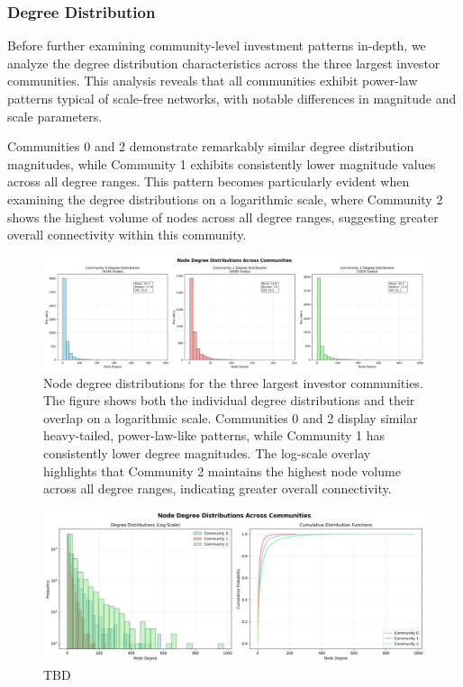 \subsubsection{Degree Distribution}

Before further examining community-level investment patterns in-depth, we analyze the degree distribution characteristics across the three largest investor communities. This analysis reveals that all communities exhibit power-law patterns typical of scale-free networks, with notable differences in magnitude and scale parameters.

Communities 0 and 2 demonstrate remarkably similar degree distribution magnitudes, while Community 1 exhibits consistently lower magnitude values across all degree ranges. This pattern becomes particularly evident when examining the degree distributions on a logarithmic scale, where Community 2 shows the highest volume of nodes across all degree ranges, suggesting greater overall connectivity within this community.


\begin{figure}[ht]
\centering
\includegraphics[width=1\textwidth]{../figures/us/node_degree_distributions_comprehensive_pt1.png}
\caption{Node degree distributions for the three largest investor communities. The figure shows both the individual degree distributions and their overlap on a logarithmic scale. Communities 0 and 2 display similar heavy-tailed, power-law-like patterns, while Community 1 has consistently lower degree magnitudes. The log-scale overlay highlights that Community 2 maintains the highest node volume across all degree ranges, indicating greater overall connectivity.}
\label{fig:node_degree_distributions}
\end{figure}

\begin{figure}[ht]
\centering
\includegraphics[width=1\textwidth]{../figures/us/node_degree_distributions_comprehensive_pt2.png}
\caption{TBD}
\label{fig:node_degree_distributions}
\end{figure}

